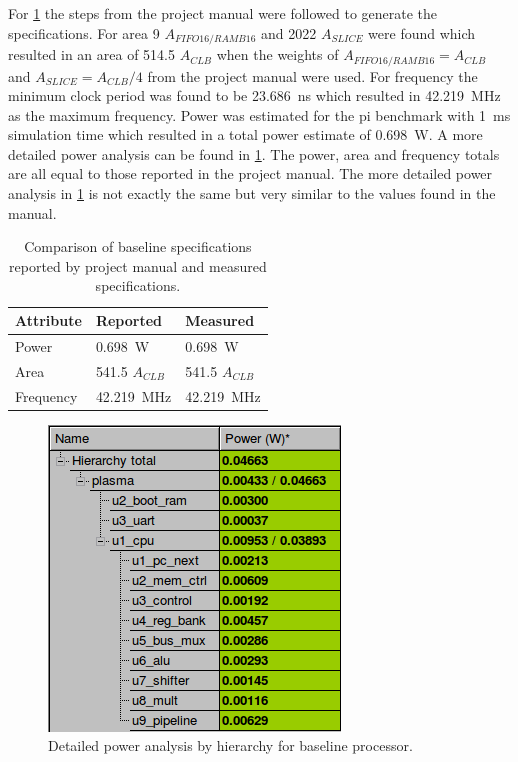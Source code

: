 For \cref{tab:baselineperformance} the steps from the project manual were followed to generate the specifications. For area 9 $A_{FIFO16/RAMB16}$ and 2022 $A_{SLICE}$ were found which resulted in an area of 514.5 $A_{CLB}$ when the weights of $A_{FIFO16/RAMB16} = A_{CLB}$ and $A_{SLICE} = A_{CLB}/4$ from the project manual were used. For frequency the minimum clock period was found to be \SI{23.686}{\nano\second} which resulted in \SI{42.219}{\mega\hertz} as the maximum frequency. Power was estimated for the pi benchmark with \SI{1}{\milli\second} simulation time which resulted in a total power estimate of \SI{0.698}{\watt}. A more detailed power analysis can be found in \cref{fig:baselinepower}. The power, area and frequency totals are all equal to those reported in the project manual. The more detailed power analysis in \cref{fig:baselinepower} is not exactly the same but very similar to the values found in the manual.
\begin{table}[H]
\centering
\begin{tabular}{lll}
\hline
Attribute       & Reported & Measured \\ \hline
Power    &  \SI{0.698}{\watt}        &   \SI{0.698}{\watt}                \\
Area     &       541.5 $A_{CLB}$            & 541.5 $A_{CLB}$             \\
Frequency    &   \SI{42.219}{\mega\hertz}           &  \SI{42.219}{\mega\hertz}                         \\\hline
\end{tabular}
\caption{Comparison of baseline specifications reported by project manual and measured specifications.}
\label{tab:baselineperformance}
\end{table}

\begin{figure}[H]
\centering
\includegraphics{../resource/baselinepower}
\caption{Detailed power analysis by hierarchy for baseline processor.}
\label{fig:baselinepower}
\end{figure}

